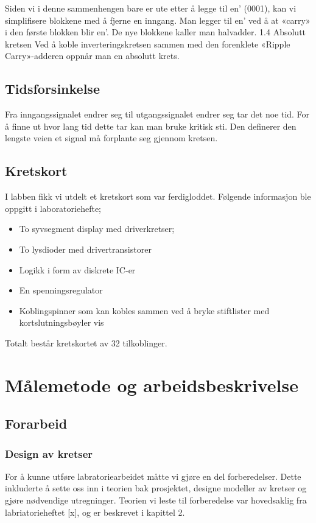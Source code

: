\documentclass{article}
\begin{document}
Siden vi i denne sammenhengen bare er ute etter å legge til en’ (0001), kan vi simplifisere blokkene med å fjerne en inngang. Man legger til en’ ved å at «carry» i den første blokken blir en’. De nye blokkene kaller man halvadder.
1.4 Absolutt kretsen
Ved å koble inverteringskretsen sammen med den forenklete «Ripple Carry»-adderen oppnår man en absolutt krets.

\subsection{Tidsforsinkelse}
Fra inngangssignalet endrer seg til utgangssignalet endrer seg tar det noe tid. For å finne ut hvor lang tid dette tar kan man bruke kritisk sti. Den definerer den lengste veien et signal må forplante seg gjennom kretsen.

\subsection{Kretskort}
I labben fikk vi utdelt et kretskort som var ferdigloddet. Følgende informasjon ble oppgitt i laboratoriehefte;
\begin{itemize}
\item To syvsegment display med driverkretser;
\item To lysdioder med drivertransistorer
\item Logikk i form av diskrete IC-er
\item En spenningsregulator
\item Koblingspinner som kan kobles sammen ved å bryke stiftlister med kortslutningsbøyler
vis
\end{itemize}
Totalt består kretskortet av 32 tilkoblinger.

\section{Målemetode og arbeidsbeskrivelse}

\subsection{Forarbeid}
\subsubsection{Design av kretser}
For å kunne utføre labratoriearbeidet måtte vi gjøre en del forberedelser. Dette inkluderte å sette oss inn i teorien bak prosjektet, designe modeller av kretser og gjøre nødvendige utregninger. Teorien vi leste til forberedelse var hovedsaklig fra labriatorieheftet [x], og er beskrevet i kapittel 2.
\end{document}
